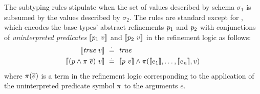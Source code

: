 The subtyping rules stipulate when the set of values described 
by schema $\sigma_1$ is subsumed by the values described by $\sigma_2$.
The rules are standard except for \tsubVar, which encodes the base types' 
abstract refinements $p_1$ and $p_2$ with conjunctions of 
\emph{uninterpreted predicates} 
$[\![p_1\ v]\!]$ and $[\![p_2\ v]\!]$ in the 
refinement logic as follows:
\begin{align*}
\inter{\true\ \vref} & \defeq \true\\
\inter{(\areft \land \rvapp{\rvar}{e})\ \vref} & \defeq \inter{\areft\
\vref} \land \rvar(\inter{e_1},\ldots,\inter{e_n},\vref)
\end{align*}
where $\pi(\overline{e})$ is a term in the refinement logic corresponding
to the application of the uninterpreted predicate symbol $\pi$ to the 
arguments $\overline{e}$.

